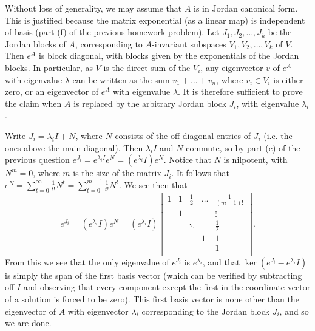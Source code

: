 \documentclass{scrartcl}
\begin{document}
\begin{solution}
        \begin{subproof}
        Without loss of generality, we may assume that $A$ is in Jordan canonical form. This is justified because the matrix exponential (as a linear map) is independent of basis (part (f) of the previous homework problem). Let $J_1,J_2,\dots, J_k$ be the Jordan blocks of $A$, corresponding to $A$-invariant subspaces $V_1,V_2,\dots, V_k$ of $V$. Then $e^A$ is block diagonal, with blocks given by the exponentials of the Jordan blocks. In particular, as $V$ is the direct sum of the $V_i$, any eigenvector $v$ of $e^A$ with eigenvalue $\lambda$ can be written as the sum $v_1+\dots + v_n$, where $v_i\in V_i$ is either zero, or an eigenvector of $e^A$ with eigenvalue $\lambda$. It is therefore sufficient to prove the claim when $A$ is replaced by the arbitrary Jordan block $J_i$, with eigenvalue $\lambda_i$.
        
        Write $J_i=\lambda_iI+N$, where $N$ consists of the off-diagonal entries of $J_i$ (i.e. the ones above the main diagonal). Then $\lambda_i I$ and $N$ commute, so by part (c) of the previous question $e^{J_i}=e^{\lambda_iI}e^N=(e^{\lambda_i}I)e^N$. Notice that $N$ is nilpotent, with $N^m=0$, where $m$ is the size of the matrix $J_i$. It follows that $e^N=\sum_{t=0}^\infty \tfrac{1}{t!}N^t=\sum_{t=0}^{m-1} \tfrac{1}{t!}N^t$. We see then that
        \[e^{J_i}=(e^{\lambda_i}I)e^N=(e^{\lambda_i}I)
        \begin{bmatrix}
        1 & 1 & \tfrac{1}{2} & \hdots & \tfrac{1}{(m-1)!} \\
        & 1 & & & \vdots \\
        & & \ddots & & \tfrac{1}{2} \\
        & & & 1 & 1 \\
        & & & & 1\\
        \end{bmatrix}.\]
        From this we see that the only eigenvalue of $e^{J_i}$ is $e^{\lambda_i}$, and that $\ker(e^{J_i}-e^{\lambda_i}I)$ is simply the span of the first basis vector (which can be verified by subtracting off $I$ and observing that every component except the first in the coordinate vector of a solution is forced to be zero). This first basis vector is none other than the eigenvector of $A$ with eigenvector $\lambda_i$ corresponding to the Jordan block $J_i$, and so we are done.
        \end{subproof}
        

\end{solution}
\end{document}
